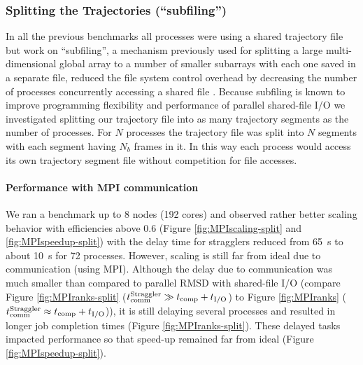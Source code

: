 \subsubsection{Splitting the Trajectories (``subfiling'')}
\label{splitting-traj}
In all the previous benchmarks all processes were using a shared trajectory file but work on ``subfiling'', a mechanism previously used for splitting a large multi-dimensional global array to a number of smaller subarrays with each one saved in a separate file, reduced the file system control overhead by decreasing the number of processes concurrently accessing a shared file \cite{scalable-IO, scalable-IO1}.
Because subfiling is known to improve programming flexibility and performance of parallel shared-file I/O we investigated splitting our trajectory file into as many trajectory segments as the number of processes.
For $N$ processes the trajectory file was split into $N$ segments with each segment having $N_{b}$ frames in it. 
In this way each  process would access its own trajectory segment file without competition for file accesses. 


\paragraph{Performance with MPI communication}
We ran a benchmark up to 8 nodes (192 cores) and observed rather better scaling behavior with efficiencies above 0.6 (Figure \ref{fig:MPIscaling-split} and \ref{fig:MPIspeedup-split}) with the delay time for stragglers reduced from 65~s to about 10~s for 72 processes. 
However, scaling is still far from ideal due to communication (using MPI). 
Although the delay due to communication was much smaller than compared to parallel RMSD with shared-file I/O (compare Figure \ref{fig:MPIranks-split} ($t_{\text{comm}}^{\text{Straggler}} \gg {t}_{\text{comp}}+{t}_{\text{I/O}}$) to Figure \ref{fig:MPIranks} ($t_{\text{comm}}^{\text{Straggler}} \approx {t}_{\text{comp}}+{t}_{\text{I/O}}$)), it is still delaying several processes and resulted in longer job completion times (Figure \ref{fig:MPIranks-split}). 
These delayed tasks impacted performance so that speed-up remained far from ideal (Figure \ref{fig:MPIspeedup-split}).

